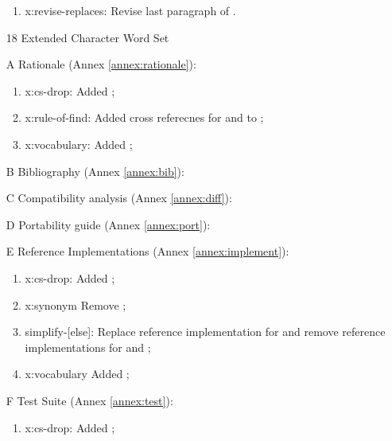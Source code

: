 \begin{itemize}
		\begin{enumerate}
		\item \textsf{x:revise-replaces}: Revise last paragraph of .
		\end{enumerate}
	\item[18] Extended Character Word Set	%
	\item[A] Rationale (Annex \ref{annex:rationale}):	%
		\begin{enumerate}
		\item \textsf{x:cs-drop}: Added ;
		\item \textsf{x:rule-of-find}: Added cross referecnes for
			 and  to
			;
		\item \textsf{x:vocabulary}: Added ;
		\end{enumerate}
	\item[B] Bibliography (Annex \ref{annex:bib}):		%
	\item[C] Compatibility analysis (Annex \ref{annex:diff}):	%
	\item[D] Portability guide (Annex \ref{annex:port}):		%
	\item[E] Reference Implementations (Annex \ref{annex:implement}): %
		\begin{enumerate}
		\item \textsf{x:cs-drop}: Added ;
		\item \textsf{x:synonym} Remove ; %
		\item \textsf{simplify-[else]}: Replace reference implementation for
			 and remove reference implementations
			for  and ;
		\item \textsf{x:vocabulary} Added ;
		\end{enumerate}
	\item[F] Test Suite (Annex \ref{annex:test}):	%
		\begin{enumerate}
		\item \textsf{x:cs-drop}: Added ;
		\end{enumerate}
	\end{itemize}

